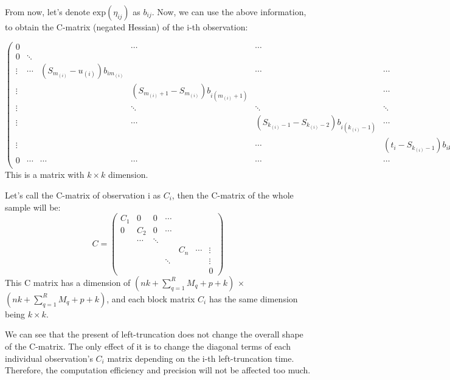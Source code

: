 \documentclass[]{article}
\begin{document}
From now, let's denote \(\text{exp}(\eta_{ij})\) as \(b_{ij}\). Now, we
can use the above information, to obtain the C-matrix (negated Hessian)
of the i-th observation:

\begin{equation}
\begin{pmatrix} 
0 &   &  & \cdots & \cdots &  & \cdots \\
0 & \ddots  &   &  & && &  \\
\vdots & \cdots & (S_{m_{(i)}}-u_{(i)}) b_{im_{(i)}} &  & \cdots & \cdots & \cdots &  \\
\vdots & & &(S_{m_{(i)}+1}-S_{m_{(i)}})b_{i(m_{(i)}+1)} &  & \cdots & \cdots& \\
\vdots & & & \ddots  & \ddots & \ddots & \cdots& \\
\vdots  & & & \cdots & (S_{k_{(i)}-1}-S_{k_{(i)}-2})b_{i(k_{(i)}-1)}  & \cdots &  \\
\vdots  & && & \cdots & (t_i-S_{k_{(i)}-1})b_{ik_{(i)}} & \cdots\\
0 & \cdots &  \cdots & \cdots & \cdots & \cdots & \ddots \\
\end{pmatrix}
\end{equation} This is a matrix with \(k \times k\) dimension.

Let's call the C-matrix of observation i as \(C_i\), then the C-matrix
of the whole sample will be: \begin{equation}
C = \begin{pmatrix} 
C_1 & 0 & 0 & \cdots & & \\ 
0 & C_2 & 0 & \cdots & & \\
  & \cdots & \ddots &  & & \\
& & & & C_n & \cdots & \vdots \\ 
& & & \ddots & &&\vdots \\
& & & & & & 0
\end{pmatrix}
\end{equation} This C matrix has a dimension of
\((nk+\sum_{q=1}^{R}M_q + p +k)\) \(\times\)
\((nk+\sum_{q=1}^{R}M_q + p +k)\), and each block matrix \(C_i\) has the
same dimension being \(k\times k\).

We can see that the present of left-truncation does not change the
overall shape of the C-matrix. The only effect of it is to change the
diagonal terms of each individual observation's \(C_i\) matrix depending
on the i-th left-truncation time. Therefore, the computation efficiency
and precision will not be affected too much.
\end{document}
